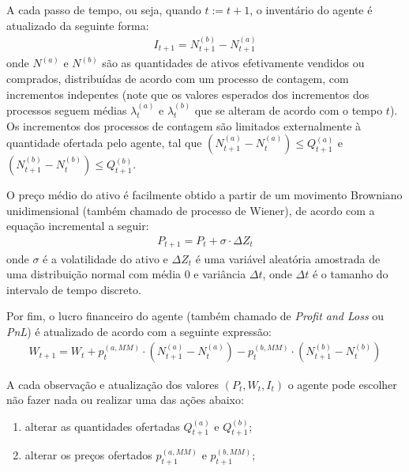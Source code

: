 A cada passo de tempo, ou seja, quando $t := t + 1$, o inventário do agente é atualizado da seguinte forma:
\begin{equation}
    \begin{aligned}
    	I_{t + 1} = N^{(b)}_{t + 1} - N^{(a)}_{t + 1} \label{eq:inventory}
    \end{aligned}
\end{equation}
onde $N^{(a)}$ e $N^{(b)}$ são as quantidades de ativos efetivamente vendidos ou comprados, distribuídas de acordo com um processo de contagem, com incrementos indepentes (note que os valores esperados dos incrementos dos processos seguem médias $\lambda_{t}^{(a)}$ e $\lambda_{t}^{(b)}$ que se alteram de acordo com o tempo $t$). Os incrementos dos processos de contagem são limitados externalmente à quantidade ofertada pelo agente, tal que $(N_{t + 1}^{(a)} - N_{t}^{(a)}) \leq Q_{t + 1}^{(a)}$ e $(N_{t + 1}^{(b)} - N_{t}^{(b)}) \leq Q_{t + 1}^{(b)}$.

O preço médio do ativo é facilmente obtido a partir de um movimento Browniano unidimensional (também chamado de processo de Wiener), de acordo com a equação incremental a seguir:
\begin{equation}
	\begin{aligned}
		P_{t+1} = P_t + \sigma \cdot \Delta Z_t
		\label{eq:midprice}
	\end{aligned}
\end{equation}
onde \(\sigma\) é a volatilidade do ativo e \(\Delta Z_t\) é uma variável aleatória amostrada de uma distribuição normal com média 0 e variância \(\Delta t\), onde \(\Delta t\) é o tamanho do intervalo de tempo discreto.

Por fim, o lucro financeiro do agente (também chamado de \textit{Profit and Loss} ou \textit{PnL}) é atualizado de acordo com a seguinte expressão:
\begin{equation}
	\begin{aligned}
		W_{t + 1} = W_{t} + p^{(a, MM)}_{t} \cdot (N^{(a)}_{t + 1} - N^{(a)}_{t}) - p^{(b, MM)}_{t} \cdot (N^{(b)}_{t + 1} - N^{(b)}_{t} )
		\label{eq:pnl}
	\end{aligned}
\end{equation}

A cada observação e atualização dos valores $(P_{t}, W_{t}, I_{t})$ o agente pode escolher não fazer nada ou realizar uma das ações abaixo:
\begin{enumerate}
    \item alterar as quantidades ofertadas $Q^{(a)}_{t + 1}$ e $Q^{(b)}_{t + 1}$;
    \item alterar os preços ofertados $p^{(a, MM)}_{t + 1}$ e $p^{(b, MM)}_{t + 1}$;
\end{enumerate}

